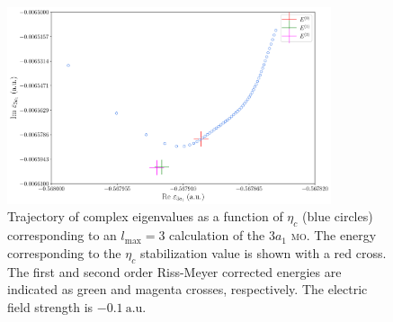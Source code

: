 

\begin{figure}
  \centering
  \includegraphics[width=0.85\textwidth]{figures/ch_H2O/partial_wave/3a1trajectory.pdf}
  \caption{Trajectory of complex eigenvalues as a function of
    $\eta_{c}$ (blue circles) corresponding to an $l_{\mathrm{max}}=3$
    calculation of the $3a_{1}$ \textsc{mo}. The energy corresponding
    to the $\eta_{c}$ stabilization value is shown with a red
    cross. The first and second order Riss-Meyer corrected energies
    are indicated as green and magenta crosses, respectively. The
    electric field strength is $-0.1\ \mathrm{a.u.}$}
  \label{fig:3a1_RMtrajectory}
\end{figure}























